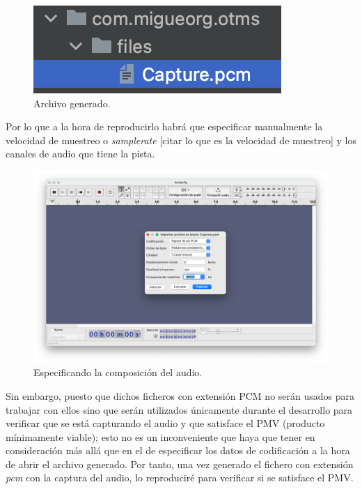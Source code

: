 \begin{figure}[htb]
    \centering
    \includegraphics{fotos/archivo_generado.png}
    \caption{Archivo generado.}
\end{figure}


Por lo que a la hora de reproducirlo habrá que especificar manualmente la
velocidad de muestreo o \emph{samplerate} [citar lo que es la velocidad de
muestreo] y los canales de audio que tiene la pista. 

\begin{figure}[htb]
    \centering
    \includegraphics[width=\textwidth]{fotos/importando_datos_en_bruto_audacity.png}
    \caption{Especificando la composición del audio.}
\end{figure}

Sin embargo, puesto que dichos ficheros con extensión PCM no serán usados para
trabajar con ellos sino que serán utilizados únicamente durante el desarrollo
para verificar que se está capturando el audio y que satisface el PMV (producto
mínimamente viable); esto no es un inconveniente que haya que tener en
consideración más allá que en el de especificar los datos de codificación a la
hora de abrir el archivo generado. Por tanto, una vez generado el fichero con
extensión \emph{pcm} con la captura del audio, lo reproduciré para verificar si
se satisface el PMV. 

